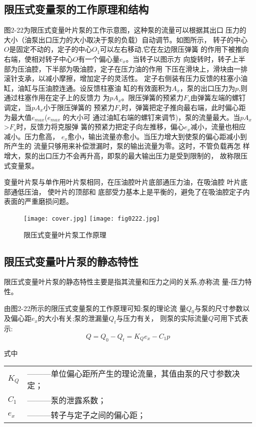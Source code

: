 \subsection*{限压式变量泵的工作原理和结构} 
图2-22为限压式变量叶片泵的工作示意图，这种泵的流量可以根据其出口
压力的大小（油泵出口压力的大小取决于泵的负载）自动调节。如图所示， 
转子的中心$O$是固定不动的，定子的中心$O_1$可以左右移动,它在左边限压弹簧
的作用下被推向右端，使相对转子中心$O$有一个偏心量$e_x$。当转子以图示方
向旋转时，转子上半部为压油腔，下半部为吸油腔，定子在压力油的作用
下压在滑块上，滑块由一排滚针支承，以减小摩擦，增加定子的灵活性。
定子右侧装有压力反馈的柱塞小油缸，油缸与压油腔连通。设反馈柱塞油
缸的有效面积为$A_x$，泵的出口压力为$p$,则通过柱塞作用在定子上的反馈力
为$p$$A_x$。限压弹簧的预紧力$F_s$由弹簧左端的螺钉调定，当$p$$A_x$小于限压弹簧的
预紧力$F_s$时，弹簧把定子推向最右端，此时偏心距为最大值$e_{max}$($e_{max}$
的大小可
通过油缸右端的螺钉来调节)，泵的流量最大。当$p$$A_x$>$F_s$时，反馈力将克服弹
簧的预紧力把定子向左推移，偏心$e_x$减小，流量也相应减小。压力愈高，
$e_x$愈小，输出流量亦愈小。当压力增大到使泵的偏心距减小到所产生的
流量只够用来补偿泄漏时，泵的输出流量为零。这时，不管负载再怎
样增大，泵的出口压力不会再升高，即泵的最大输出压力是受到限制的，
故称限压式变量泵。

变量叶片泵与单作用叶片泵相同，在压油腔叶片底部通压力油，在吸油腔
叶片底部通低压油，
使叶片的顶部和
底部受力基本上是平衡的，避免了在吸油腔定子内表面的严重磨损问题。
\begin{figure} [htbp]
    \centering
    \ifOpenSource
    \texttt{[image: cover.jpg]}
    \else
    \texttt{[image: fig0222.jpg]}
    \fi
    \caption{限压式变量叶片泵工作原理} 
    \label{fig:fig0222}
\end{figure}
\subsection*{限压式变量叶片泵的静态特性}
限压式变量叶片泵的静态特性主要是指其流量和压力之间的关系,亦称流
量-压力特性。

由图2-22所示的限压式变量泵的工作原理可知:泵的理论流
量$Q_0$与泵的尺寸参数以及偏心距$e_x$的大小有关;泵的泄漏量$Q_t$与压力有关，
则泵的实际流量$Q$可用下式表示:
    \begin{equation*}
        Q=Q_0-Q_t=K_Qe_x-C_1p
    \end{equation*}   

式中
\begin{tabular}[t]{ll}
    $K_Q$&———单位偏心距所产生的理论流量，其值由泵的尺寸参数决定；\\
    $C_1$&———泵的泄露系数；\\
    $e_x$&———转子与定子之间的偏心距；
\end{tabular}\\

